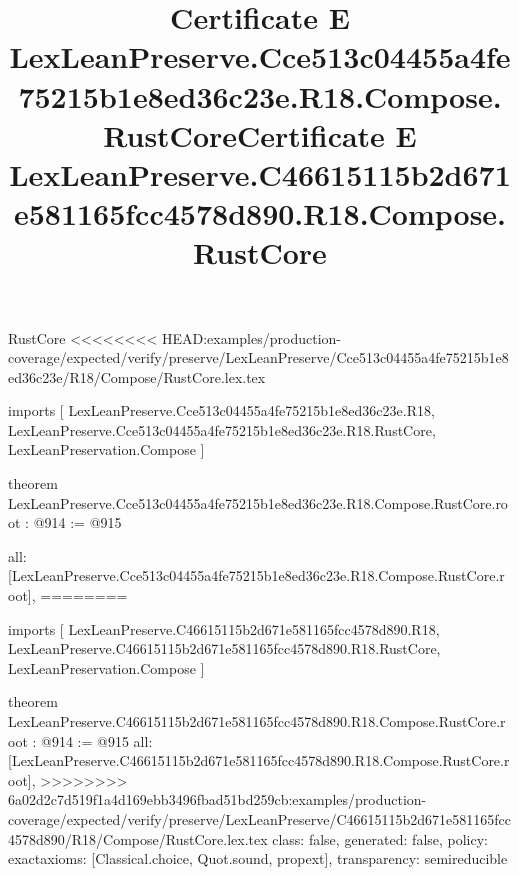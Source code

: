 \begin{lexlean}{RustCore}
<<<<<<<< HEAD:examples/production-coverage/expected/verify/preserve/LexLeanPreserve/Cce513c04455a4fe75215b1e8ed36c23e/R18/Compose/RustCore.lex.tex
\title{Certificate E LexLeanPreserve.Cce513c04455a4fe75215b1e8ed36c23e.R18.Compose.RustCore}
\begin{coremodule}
imports [
  LexLeanPreserve.Cce513c04455a4fe75215b1e8ed36c23e.R18,
  LexLeanPreserve.Cce513c04455a4fe75215b1e8ed36c23e.R18.RustCore,
  LexLeanPreservation.Compose
]

theorem LexLeanPreserve.Cce513c04455a4fe75215b1e8ed36c23e.R18.Compose.RustCore.root : @914 := @915 {
  all: [LexLeanPreserve.Cce513c04455a4fe75215b1e8ed36c23e.R18.Compose.RustCore.root],
========
\title{Certificate E LexLeanPreserve.C46615115b2d671e581165fcc4578d890.R18.Compose.RustCore}
\begin{coremodule}
imports [
  LexLeanPreserve.C46615115b2d671e581165fcc4578d890.R18,
  LexLeanPreserve.C46615115b2d671e581165fcc4578d890.R18.RustCore,
  LexLeanPreservation.Compose
]

theorem LexLeanPreserve.C46615115b2d671e581165fcc4578d890.R18.Compose.RustCore.root : @914 := @915 {
  all: [LexLeanPreserve.C46615115b2d671e581165fcc4578d890.R18.Compose.RustCore.root],
>>>>>>>> 6a02d2c7d519f1a4d169ebb3496fbad51bd259cb:examples/production-coverage/expected/verify/preserve/LexLeanPreserve/C46615115b2d671e581165fcc4578d890/R18/Compose/RustCore.lex.tex
  class: false,
  generated: false,
  policy: exact{axioms: [Classical.choice, Quot.sound, propext]},
  transparency: semireducible
}


\end{coremodule}}
\end{coremodule}
\end{lexlean}
